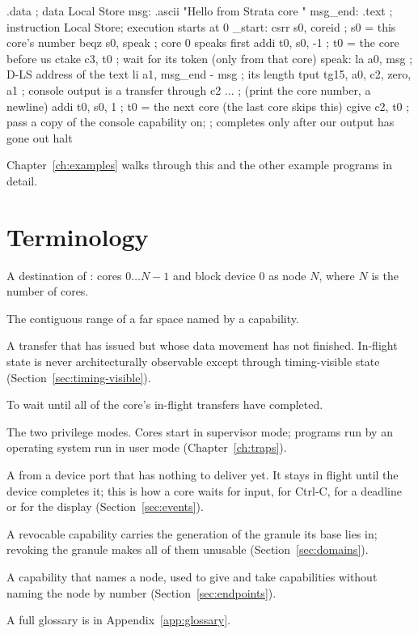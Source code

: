 \begin{asm}
        .data                           ; data Local Store
msg:    .ascii "Hello from Strata core "
msg_end:
        .text                           ; instruction Local Store; execution starts at 0
_start: csrr  s0, coreid                ; s0 = this core's number
        beqz  s0, speak                 ; core 0 speaks first
        addi  t0, s0, -1                ; t0 = the core before us
        ctake c3, t0                    ; wait for its token (only from that core)
speak:  la    a0, msg                   ; D-LS address of the text
        li    a1, msg_end - msg         ; its length
        tput  tg15, a0, c2, zero, a1    ; console output is a transfer through c2
        ...                             ; (print the core number, a newline)
        addi  t0, s0, 1                 ; t0 = the next core (the last core skips this)
        cgive c2, t0                    ; pass a copy of the console capability on;
                                        ; completes only after our output has gone out
        halt
\end{asm}

Chapter~\ref{ch:examples} walks through this and the other example programs in detail.

\section{Terminology}
\begin{description}[leftmargin=1em,style=nextline]
\item[Node] A destination of : cores $0 \ldots N-1$ and block device 0 as node $N$, where
  $N$ is the number of cores.
\item[Segment] The contiguous range of a far space named by a capability.
\item[In flight] A transfer that has issued but whose data movement has not finished. In-flight state
  is never architecturally observable except through timing-visible state (Section~\ref{sec:timing-visible}).
\item[Drain] To wait until all of the core's in-flight transfers have completed.
\item[Supervisor, user] The two privilege modes. Cores start in supervisor mode; programs run by an
  operating system run in user mode (Chapter~\ref{ch:traps}).
\item[Pending device read] A  from a device port that has nothing to deliver yet. It stays in
  flight until the device completes it; this is how a core waits for input, for Ctrl-C, for a deadline
  or for the display (Section~\ref{sec:events}).
\item[Revocation by address] A revocable capability carries the generation of the granule its base
  lies in; revoking the granule makes all of them unusable (Section~\ref{sec:domains}).
\item[Endpoint] A capability that names a node, used to give and take capabilities without naming the
  node by number (Section~\ref{sec:endpoints}).
\end{description}
A full glossary is in Appendix~\ref{app:glossary}.
